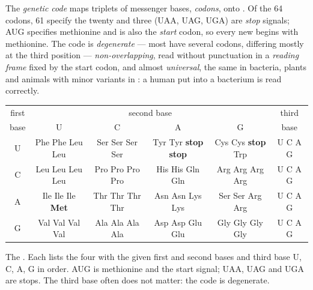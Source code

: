 \begin{definition}\label{def:b1:gene-expression:code}
The \emph{genetic code} maps triplets of messenger bases,
\emph{codons}, onto . Of the 64 codons, 61 specify the
twenty  and three (UAA, UAG, UGA) are \emph{stop} signals;
AUG specifies methionine and is also the \emph{start} codon, so every
new  begins with methionine. The code is
\emph{degenerate} --- most  have several codons, differing
mostly at the third position --- \emph{non-overlapping}, read without
punctuation in a \emph{reading frame} fixed by the start codon, and
almost \emph{universal}, the same in bacteria, plants and animals
with minor variants in : a human  put into a
bacterium is read correctly.
\end{definition}

\begin{omfigure}
\begin{center}
\footnotesize
\begin{tabular}{c|cccc|c}
\hline
first & \multicolumn{4}{c|}{second base} & third \\
base & U & C & A & G & base \\
\hline
U & Phe Phe Leu Leu & Ser Ser Ser Ser & Tyr Tyr \textbf{stop} \textbf{stop} & Cys Cys \textbf{stop} Trp & U C A G \\
C & Leu Leu Leu Leu & Pro Pro Pro Pro & His His Gln Gln & Arg Arg Arg Arg & U C A G \\
A & Ile Ile Ile \textbf{Met} & Thr Thr Thr Thr & Asn Asn Lys Lys & Ser Ser Arg Arg & U C A G \\
G & Val Val Val Val & Ala Ala Ala Ala & Asp Asp Glu Glu & Gly Gly Gly Gly & U C A G \\
\hline
\end{tabular}
\end{center}

{\small The . Each  lists the four  with the
given first and second bases and third base U, C, A, G in order. AUG
is methionine and the start signal; UAA, UAG and UGA are stops. The
third base often does not matter: the code is degenerate.}
\end{omfigure}


